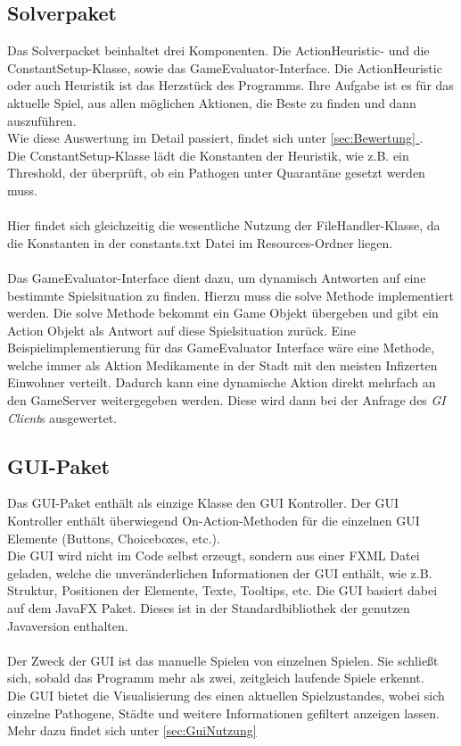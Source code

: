 \documentclass{article}
\newcommand{\fullref}[1]{\hyperref[{#1}]{\ref{#1} \nameref{#1}}} %
\newcommand{\gquote}[1]{\glqq #1\grqq} %
\let\oldgls\gls
\renewcommand{\gls}[1]{\emph{\oldgls{#1}}} %
\begin{document}
\subsection{Solverpaket}
Das Solverpacket beinhaltet drei Komponenten. Die ActionHeuristic- und die  ConstantSetup-Klasse, sowie das GameEvaluator-Interface.
Die ActionHeuristic oder auch Heuristik ist das \gquote{Herzstück} des Programms. Ihre Aufgabe ist es für das aktuelle Spiel, aus allen möglichen Aktionen, die Beste zu finden und dann auszuführen. \\
Wie diese Auswertung im Detail passiert, findet sich unter \fullref{sec:Bewertung}. \\
Die ConstantSetup-Klasse lädt die Konstanten der Heuristik, wie z.B. ein Threshold, der überprüft, ob ein Pathogen unter Quarantäne gesetzt werden muss. \\\\
Hier findet sich gleichzeitig die wesentliche Nutzung der FileHandler-Klasse, da die Konstanten in der \gquote{constants.txt} Datei im Resources-Ordner liegen. \\\\
Das GameEvaluator-Interface dient dazu, um dynamisch Antworten auf eine bestimmte Spielsituation zu finden. Hierzu muss die \gquote{solve} Methode implementiert werden. Die \gquote{solve} Methode bekommt ein Game Objekt übergeben und gibt ein Action Objekt als Antwort auf diese Spielsituation zurück. Eine Beispielimplementierung für das GameEvaluator Interface wäre eine Methode, welche immer als Aktion Medikamente in der Stadt mit den meisten Infizerten Einwohner verteilt. Dadurch kann eine dynamische Aktion direkt mehrfach an den GameServer weitergegeben werden. Diese wird dann bei der Anfrage des \gls{GI Client}s ausgewertet.
\subsection{GUI-Paket}
Das GUI-Paket enthält als einzige Klasse den GUI Kontroller. Der GUI Kontroller enthält überwiegend \gquote{On-Action-Methoden} für die einzelnen GUI Elemente (\gquote{Buttons}, \gquote{Choiceboxes}, etc.). \\
Die GUI wird nicht im Code selbst erzeugt, sondern aus einer FXML Datei geladen, welche die unveränderlichen Informationen der GUI enthält, wie z.B. Struktur, Positionen der Elemente, Texte, Tooltips, etc. Die GUI basiert dabei auf dem JavaFX Paket. Dieses ist in der Standardbibliothek der genutzen Javaversion enthalten.\\\\
Der Zweck der GUI ist das manuelle Spielen von einzelnen Spielen. Sie schließt sich, sobald das Programm mehr als zwei, zeitgleich laufende Spiele erkennt. \\
Die GUI bietet die Visualisierung des einen aktuellen Spielzustandes, wobei sich einzelne Pathogene, Städte und weitere Informationen gefiltert anzeigen lassen. Mehr dazu findet sich unter \fullref{sec:GuiNutzung}
\end{document}
